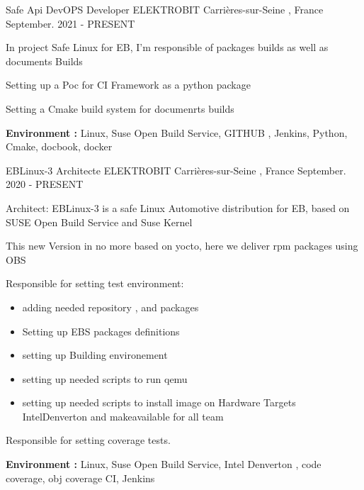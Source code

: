 \documentclass[11pt, a4paper]{awesome-cv} %
\begin{document}
\begin{cventries}


 \cventry
    {Safe Api DevOPS Developer} %
    {ELEKTROBIT} %
    {Carrières-sur-Seine , France} %
    {September. 2021 - PRESENT} %
    { %
        \begin{cvitems}
            \item {In project Safe Linux for EB, I'm responsible of packages builds as well as documents Builds}
            \item {Setting up a Poc for CI Framework as a python package}
            \item {Setting a Cmake build system for documenrts builds}                        
            \item { \textbf{Environment :} Linux, Suse Open Build Service, GITHUB , Jenkins, Python, Cmake, docbook, docker}
        \end{cvitems}
    }


    \cventry
    {EBLinux-3 Architecte} %
    {ELEKTROBIT} %
    {Carrières-sur-Seine , France} %
    {September. 2020 - PRESENT} %
    { %
        \begin{cvitems}
            \item {Architect: EBLinux-3 is a safe Linux Automotive distribution for EB, based on SUSE Open Build Service and Suse Kernel}
            \item {This new Version in no more based on yocto, here we deliver rpm packages using OBS}
            \item {Responsible for setting test environment:}
            \begin{itemize}
                \item adding needed repository , and packages 
                \item Setting up EBS packages definitions   
                \item setting up Building environement 
                \item setting up needed scripts to run qemu 
                \item setting up needed scripts to install image  on Hardware Targets IntelDenverton and makeavailable for all team
              \end{itemize}
            \item {Responsible for setting coverage tests.}
            \item { \textbf{Environment :} Linux, Suse Open Build Service, Intel Denverton , code coverage, obj coverage CI, Jenkins}
        \end{cvitems}
    }


\end{cventries}
\end{document}
